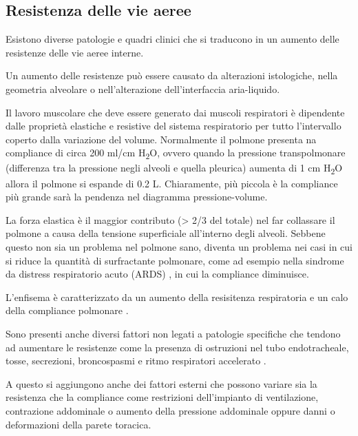 \subsection{Resistenza delle vie aeree}

Esistono diverse patologie e quadri clinici che si traducono in un aumento delle resistenze delle vie aeree interne. 

Un aumento delle resistenze può essere causato da alterazioni istologiche, nella geometria alveolare o nell'alterazione dell'interfaccia aria-liquido.

Il lavoro muscolare che deve essere generato dai muscoli respiratori è dipendente dalle proprietà elastiche e resistive del sistema respiratorio per tutto l'intervallo coperto dalla variazione del volume. Normalmente il polmone presenta na compliance di circa 200 ml/cm H\textsubscript{2}O, ovvero quando la pressione transpolmonare (differenza tra la pressione negli alveoli e quella pleurica) aumenta di 1 cm H\textsubscript{2}O allora il polmone si espande di 0.2 L. Chiaramente, più piccola è la compliance più grande sarà la pendenza nel diagramma pressione-volume. 

La forza elastica è il maggior contributo (> 2/3 del totale) nel far collassare il polmone a causa della tensione superficiale all'interno degli alveoli. Sebbene questo non sia un problema nel polmone sano, diventa un problema nei casi in cui si riduce la quantità di surfractante polmonare, come ad esempio nella sindrome da distress respiratorio acuto (ARDS) \cite{milic-emili_basics_1999}, in cui la compliance diminuisce. 

L'enfisema è caratterizzato da un aumento della resisitenza respiratoria e un calo della compliance polmonare \cite{milic-emili_basics_1999}.

Sono presenti anche diversi fattori non legati a patologie specifiche che tendono ad aumentare le resistenze come la presenza di ostruzioni nel tubo endotracheale, tosse, secrezioni, broncospasmi e ritmo respiratori accelerato \cite{grossbach_overview_2011}.

A questo si aggiungono anche dei fattori esterni che possono variare sia la resistenza che la compliance come restrizioni dell'impianto di ventilazione, contrazione addominale o aumento della pressione addominale oppure danni o deformazioni della parete toracica.

